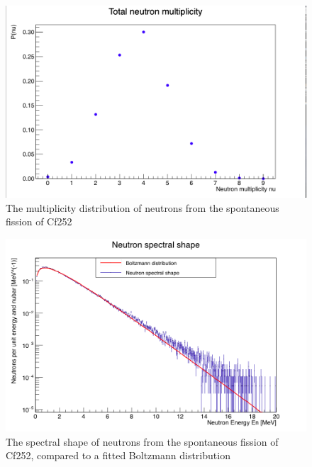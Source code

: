 \documentclass[]{article}
\begin{document}
\begin{figure} [H]
	\centering
	\includegraphics[scale=0.36]{Cf252_sf_total_n_mult.png}
	\caption{The multiplicity distribution of neutrons from the spontaneous fission of Cf252}
	\label{fig:Cf252_sf_total_n_mult}
\end{figure}

\begin{figure} [H]
	\centering
	\includegraphics[scale=0.36]{Cf252_sf_neutron_spectral_shape.png}
	\caption{The spectral shape of neutrons from the spontaneous fission of Cf252, compared to a fitted Boltzmann distribution}
	\label{fig:Cf252_sf_neutron_spectral_shape}
\end{figure}
\end{document}
